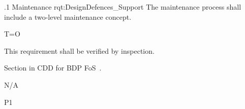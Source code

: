 \ONERQMTV
{\RqtNumberBase.1}
{Maintenance}
{rqt:DesignDefences_Support}
{The \ThisSys maintenance process shall include a two-level maintenance concept.}
{
	\item T=O
}
{This requirement shall be verified by inspection.}
{
\item [12.4] Section in CDD for BDP FoS~\cite{ref__BDP_FOS_CDD}.
}
{
	\item N/A
}
{P1}

